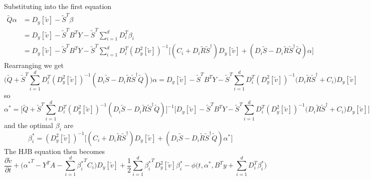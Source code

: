 Substituting into the first equation
\begin{align*}
    \tilde{Q} \alpha 
    &= D_y[\tilde{v}] - \tilde{S}^T \beta\\
    &= D_y[\tilde{v}] - \tilde{S}^T B^T Y - \tilde{S}^T \sum_{i=1}^d D_i^T \beta_i\\
    &= D_y[\tilde{v}] - \tilde{S}^T B^T Y - \tilde{S}^T \sum_{i=1}^d D_i^T (D_y^2[\tilde{v}])^{-1} \bigg[ (C_i + D_i \tilde{R}\tilde{S}^\dagger) D_y[\tilde{v}] + (D_i \tilde{S} - D_i \tilde{R}\tilde{S}^\dagger \tilde{Q})\alpha \bigg]
\end{align*}
Rearranging we get
\begin{equation}
    \bigg(\tilde{Q} + \tilde{S}^T \sum_{i=1}^d D_i^T (D_y^2[\tilde{v}])^{-1} (D_i \tilde{S} - D_i\tilde{R}\tilde{S}^\dagger \tilde{Q}) \bigg)\alpha = D_y[\tilde{v}] - \tilde{S}^T B^T Y -\tilde{S}^T \sum_{i=1}^d D_i^T (D_y^2[\tilde{v}])^{-1} \big(D_i \tilde{R}\tilde{S}^\dagger + C_i\big) D_y[\tilde{v}] 
\end{equation}
so
\begin{equation}
    \alpha^\ast = \bigg[\tilde{Q} + \tilde{S}^T \sum_{i=1}^d D_i^T (D_y^2[\tilde{v}])^{-1} (D_i \tilde{S} - D_i\tilde{R}\tilde{S}^\dagger \tilde{Q}) \bigg]^{-1} \bigg[D_y[\tilde{v}] - \tilde{S}^T B^T Y -\tilde{S}^T \sum_{i=1}^d D_i^T (D_y^2[\tilde{v}])^{-1} \big(D_i \tilde{R}\tilde{S}^\dagger + C_i\big) D_y[\tilde{v}]  \bigg] \label{eq: dual_alpha1}
\end{equation}
and the optimal $\beta_i$ are
\begin{equation}
    \beta_i^\ast = (D_y^2[\tilde{v}])^{-1} \bigg[ (C_i + D_i \tilde{R}\tilde{S}^\dagger) D_y[\tilde{v}] + (D_i \tilde{S} - D_i \tilde{R}\tilde{S}^\dagger \tilde{Q})\alpha^\ast \bigg] \label{eq: dual_beta1}
\end{equation}
The HJB equation then becomes
\begin{equation}
    \frac{\partial \tilde{v}}{\partial t} + \bigg({\alpha^\ast}^T - Y^T A - \sum_{i=1}^d {\beta_i^\ast}^T C_i\bigg)D_y[\tilde{v}] + \frac12 \sum_{i=1}^d {\beta_i^\ast}^T D_y^2[\tilde{v}] {\beta_i^\ast} - \phi\bigg(t, \alpha^\ast, B^T y + \sum_{i=1}^d D_i^T \beta_i^\ast \bigg) \label{eq: dual_hjb}
\end{equation}
